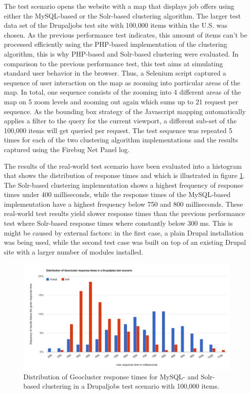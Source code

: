 The test scenario opens the website with a map that displays job offers using either the MySQL-based or the Solr-based clustering algorithm. The larger test data set of the Drupaljobs test site with 100,000 items within the U.S. was chosen. As the previous performance test indicates, this amount of items can't be processed efficiently using the PHP-based implementation of the clustering algorithm, this is why PHP-based and Solr-based clustering were evaluated. In comparison to the previous performance test, this test aims at simulating standard user behavior in the browser. Thus, a Selenium script captured a sequence of user interaction on the map as zooming into particular areas of the map. In total, one sequence consists of the zooming into 4 different areas of the map on 5 zoom levels and zooming out again which sums up to 21 request per sequence. As the bounding box strategy of the Javascript mapping automatically applies a filter to the query for the current viewport, a different sub-set of the 100,000 items will get queried per request. The test sequence was repeated 5 times for each of the two clustering algorithm implementations and the results captured using the Firebug Net Panel log.

The results of the real-world test scenario have been evaluated into a histogram that shows the distribution of response times and which is illustrated in figure \ref{fig:real-performance}. The Solr-based clustering implementation shows a highest frequency of response times under 400 milliseconds, while the response times of the MySQL-based implementation have a highest frequency below 750 and 800 milliseconds. These real-world test results yield slower response times than the previous performance test where Solr-based response times where constantly below 300 ms. This is might be caused by external factors: in the first case, a plain Drupal installation was being used, while the second test case was built on top of an existing Drupal site with a larger number of modules installed.

\begin{figure}[h]
  \begin{center}
  \hspace*{-1.5cm}\includegraphics[width=1.2\textwidth]{figures/geocluster_response_time_distribution.pdf}
    \caption{Distribution of Geocluster response times for MySQL- and Solr-based clustering in a Drupaljobs test scenario with 100,000 items.}
    \label{fig:real-performance}
  \end{center}
\end{figure}


